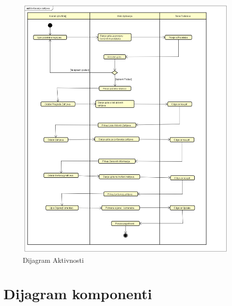 			
		\begin{figure}[H]
			\includegraphics[scale=0.3]{slike/DijagramAktivnosti.png} %
			\centering
			\caption { Dijagram Aktivnosti}
			\label{fig:4.11}
			\end{figure}

\newpage
		\section{Dijagram komponenti}
		
